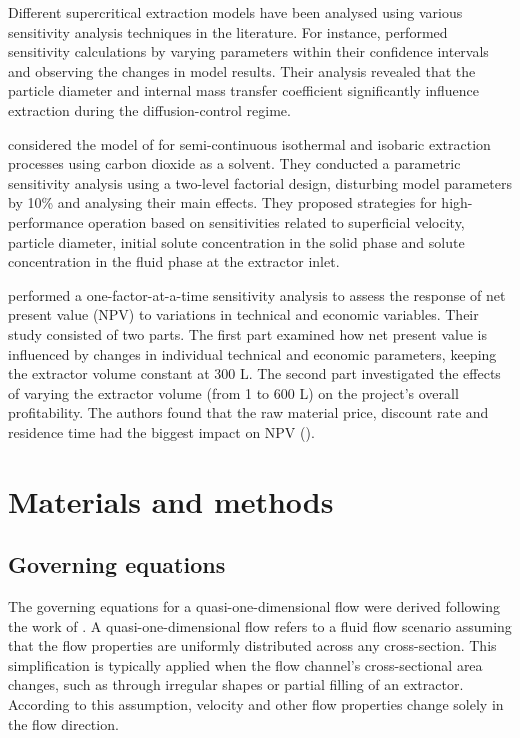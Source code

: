 \documentclass[a4paper,fleqn]{cas-dc}
\begin{document}
	Different supercritical extraction models have been analysed using various sensitivity analysis techniques in the literature. For instance, \citet{Fiori_2007} performed sensitivity calculations by varying parameters within their confidence intervals and observing the changes in model results. Their analysis revealed that the particle diameter and internal mass transfer coefficient significantly influence extraction during the diffusion-control regime.
	
	\citet{Santos2000} considered the model of \citet{Sovova1994} for semi-continuous isothermal and isobaric extraction processes using carbon dioxide as a solvent. They conducted a parametric sensitivity analysis using a two-level factorial design, disturbing model parameters by 10\% and analysing their main effects. They proposed strategies for high-performance operation based on sensitivities related to superficial velocity, particle diameter, initial solute concentration in the solid phase and solute concentration in the fluid phase at the extractor inlet.
	
	\citet{Hatami2024} performed a one-factor-at-a-time sensitivity analysis to assess the response of net present value (NPV) to variations in technical and economic variables. Their study consisted of two parts. The first part examined how net present value is influenced by changes in individual technical and economic parameters, keeping the extractor volume constant at 300 L. The second part investigated the effects of varying the extractor volume (from 1 to 600 L) on the project's overall profitability. The authors found that the raw material price, discount rate and residence time had the biggest impact on NPV (\citet{Hatami2024}).
	
	
	\section{Materials and methods} \label{CH: Materials and methods}
	
	\subsection{Governing equations} \label{CH:Governing_equations_chapter}
	The governing equations for a quasi-one-dimensional flow were derived following the work of \citet{Anderson1995}. A quasi-one-dimensional flow refers to a fluid flow scenario assuming that the flow properties are uniformly distributed across any cross-section. This simplification is typically applied when the flow channel's cross-sectional area changes, such as through irregular shapes or partial filling of an extractor. According to this assumption, velocity and other flow properties change solely in the flow direction.
	
\end{document}
